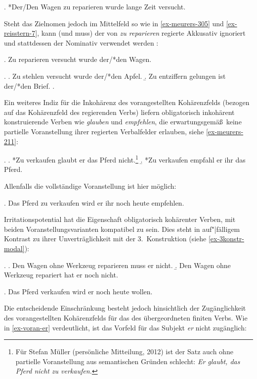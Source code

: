 \ex. *Der/Den Wagen zu reparieren wurde lange Zeit versucht. \hfill \citep[(315b)]{Meurers:99} \label{ex-meurers-315} 

Steht das Zielnomen jedoch im Mittelfeld so wie in \ref{ex-meurers-305} und \ref{ex-reisstern-7}, kann (und muss) der von {\it zu reparieren} regierte Akkusativ ignoriert und stattdessen der Nominativ verwendet werden \citep{Pollard:94}:  

\ex. Zu reparieren versucht wurde der/*den Wagen. \hfill \citep[(305)]{Meurers:99} \label{ex-meurers-305} 

\ex. \label{ex-reisstern-7}
\a. Zu stehlen versucht wurde der/*den Apfel.
\b. Zu entziffern gelungen ist der/*den Brief.
\z. \citep[(7)]{Reis:Sternefeld:04}

Ein weiteres Indiz für die Inkohärenz des vorangestellten Kohärenzfelds (bezogen auf das Kohärenzfeld des regierenden Verbs) liefern obligatorisch inkohärent konstruierende Verben wie {\it glauben} und {\it empfehlen}, die erwartungsgemä\ss\ keine partielle Voranstellung ihrer regierten Verbalfelder erlauben, siehe \ref{ex-meurers-211}: 

\ex. \label{ex-meurers-211}
\a. *Zu verkaufen glaubt er das Pferd nicht.\footnote{Für Stefan Müller (persönliche Mitteilung, 2012) ist der Satz auch ohne partielle Voranstellung aus semantischen Gründen schlecht: {\it Er glaubt, das Pferd nicht zu verkaufen.}} \hfill \citep[(211)]{Meurers:99}
\b. *Zu verkaufen empfahl er ihr das Pferd. \hfill \citep[(205c)]{Meurers:99}

Allenfalls die vollständige Voranstellung ist hier möglich:

\ex. Das Pferd zu verkaufen wird er ihr noch heute empfehlen.\hfill \citep[(212c)]{Meurers:99}

Irritationspotential hat die Eigenschaft obligatorisch kohärenter Verben, mit beiden Voranstellungsvarianten kompatibel zu sein. Dies steht in auf"|fälligem Kontrast zu ihrer Unverträglichkeit mit der 3.~Konstruktion (siehe \ref{ex-3konstr-modal}): 

\ex. 
\a. Den Wagen ohne Werkzeug reparieren muss er nicht.
\b. Den Wagen ohne Werkzeug repariert hat er noch nicht.

\ex. Das Pferd verkaufen wird er noch heute wollen. \hfill \citep[(212a)]{Meurers:99}

Die entscheidende Einschränkung besteht jedoch hinsichtlich der Zugänglichkeit des vorangestellten Kohärenzfelds für das  des übergeordneten finiten Verbs. Wie in \ref{ex-voran-er} verdeutlicht, ist das Vorfeld für das Subjekt {\it er} nicht zugänglich:

